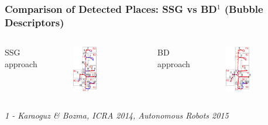 \frame
{
	\frametitle{Comparison of Detected Places: SSG vs BD$^1$ (Bubble Descriptors) }
	
	\begin{columns}[T]
		\small
		\centering
		SSG approach
		\vspace{-0.3cm}
		\begin{figure}[p]
			\centering
			\includegraphics[width = 0.5\textwidth]{img/master/detected_places_fr2_ssg.eps}
		\end{figure}
		\small
		\centering
		BD approach
		\vspace{-0.3cm}
		\begin{figure}[p]
			\centering
			\includegraphics[width = 0.5\textwidth]{img/master/detected_places_fr2_bd.eps}
		\end{figure}
	\end{columns}
	
	\vspace*{2mm}	
	\noindent \textit{\tiny 1 - Karaoguz \& Bozma,  ICRA 2014, Autonomous Robots 2015	}
}
